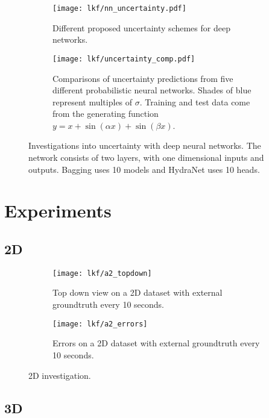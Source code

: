 \begin{figure}
    \centering
    \begin{subfigure}[]{0.9\textwidth}
    \texttt{[image: lkf/nn\_uncertainty.pdf]}
    \caption{Different proposed uncertainty schemes for deep networks.}
    \label{fig:lkf_nn_uncertainty}    
    \end{subfigure}
    
    \begin{subfigure}[]{0.9\textwidth}
    \texttt{[image: lkf/uncertainty\_comp.pdf]}
    \caption{Comparisons of uncertainty predictions from five different probabilistic neural networks. Shades of blue represent multiples of $\sigma$. Training and test data come from the generating function $y = x + \sin{(\alpha x)} + \sin{(\beta x)}$.}
	\end{subfigure}
	\label{fig:lkf_deep-uncertainty}
	\caption{Investigations into uncertainty with deep neural networks. The network consists of two layers, with one dimensional inputs and outputs. Bagging uses 10 models and HydraNet uses 10 heads.}
\end{figure}

\section{Experiments}

\subsection{2D}

\begin{figure}
    \centering
    \begin{subfigure}[]{0.9\textwidth}
    \centering
    \texttt{[image: lkf/a2\_topdown]}
	\caption{Top down view on a 2D dataset with external groundtruth every 10 seconds.}
	\label{fig:lkf_2d_topdown}    
    \end{subfigure}
    
    \begin{subfigure}[]{0.9\textwidth}
	\centering
    \texttt{[image: lkf/a2\_errors]}
	\caption{Errors on a 2D dataset with external groundtruth every 10 seconds.}
	\label{fig:lkf_2d_errors} 
		\end{subfigure}
	\label{fig:lkf_2d}
	\caption{2D investigation.}
\end{figure}

\subsection{3D}



